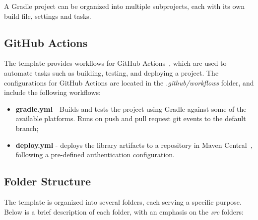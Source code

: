 A Gradle project can be organized into multiple subprojects, each with its own build file, settings and tasks.

\subsection{GitHub Actions}\label{subsec:github-actions}

The template provides workflows for GitHub Actions~\cite{github-actions}, which are used to automate tasks such as building, testing, and deploying a project.
The configurations for GitHub Actions are located in the \textit{.github/workflows} folder, and include the following workflows:

\begin{itemize}
    \item \textbf{gradle.yml} - Builds and tests the project using Gradle against some of the available platforms.
    Runs on push and pull request git events to the default branch;
    \item \textbf{deploy.yml} - deploys the library artifacts to a repository in Maven Central~\cite{maven-central}, following a pre-defined authentication configuration.
\end{itemize}

\subsection{Folder Structure}\label{subsec:folder-structure}

The template is organized into several folders, each serving a specific purpose.
Below is a brief description of each folder, with an emphasis on the \textit{src} folders:

